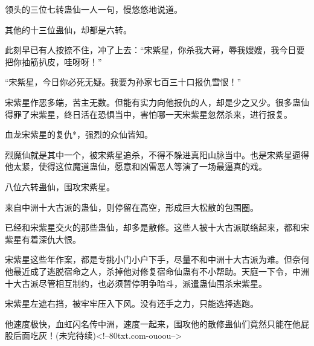 \begin{this_body}
领头的三位七转蛊仙一人一句，慢悠悠地说道。

其他的十三位蛊仙，却都是六转。

此刻早已有人按捺不住，冲了上去：“宋紫星，你杀我大哥，辱我嫂嫂，我今日要把你抽筋扒皮，哇呀呀！”

“宋紫星，今日你必死无疑。我要为孙家七百三十口报仇雪恨！”

宋紫星作恶多端，苦主无数。但能有实力向他报仇的人，却是少之又少。很多蛊仙得罪了宋紫星，终日活在恐惧当中，害怕哪一天宋紫星忽然杀来，进行报复。

血龙宋紫星的复仇*，强烈的众仙皆知。

烈魔仙就是其中一个，被宋紫星追杀，不得不躲进真阳山脉当中。也是宋紫星逼得他太紧，使得这位魔道蛊仙，愿意和凶雷恶人等演了一场最逼真的戏。

八位六转蛊仙，围攻宋紫星。

来自中洲十大古派的蛊仙，则停留在高空，形成巨大松散的包围圈。

已经和宋紫星交火的那些蛊仙，却多是散修。这些人被十大古派联络起来，都和宋紫星有着深仇大恨。

宋紫星这些年作案，都是专挑小门小户下手，尽量不和中洲十大古派为难。但奈何他最近成了逃脱宿命之人，杀掉他对修复宿命仙蛊有不小帮助。天庭一下令，中洲十大古派尽管相互制约，也必须暂停明争暗斗，派遣蛊仙围杀宋紫星。

宋紫星左遮右挡，被牢牢压入下风。没有还手之力，只能选择逃跑。

他速度极快，血虹闪名传中洲，速度一起来，围攻他的散修蛊仙们竟然只能在他屁股后面吃灰！(未完待续)<!--80txt.com-ouoou-->

\end{this_body}


